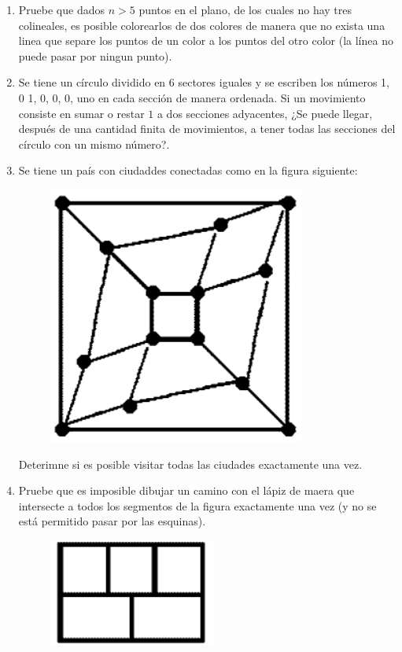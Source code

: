 \begin{enumerate}
	\item Pruebe que dados $n>5$ puntos en el plano, de los cuales no hay tres colineales, es posible colorearlos de dos colores de manera que no exista una linea que separe los puntos de un color a los puntos del otro color (la l\'inea no puede pasar por ningun punto).
	
	\item Se tiene un c\'irculo dividido en $6$ sectores iguales y se escriben los n\'umeros 1, 0 1, 0, 0, 0, uno en cada secci\'on de manera ordenada. Si un movimiento consiste en sumar o restar $1$ a dos secciones adyacentes, ¿Se puede llegar, despu\'es de una cantidad finita de movimientos, a tener todas las secciones del c\'irculo con un  mismo n\'umero?.
	
	\item Se tiene un pa\'is con ciudaddes conectadas como en la figura siguiente:
	\begin{center}
		\begin{figure}[h!]
			\centering
			\includegraphics[scale=.5]{imgs/cities.png}
		\end{figure}
	\end{center}
	Deterimne si es posible visitar todas las ciudades exactamente una vez.
	
	\item Pruebe que es imposible dibujar un camino con el l\'apiz de maera que intersecte a todos los segmentos de la figura exactamente una vez (y no se est\'a permitido pasar por las esquinas).
	\begin{center}
		\begin{figure}[h!]
			\centering
			\includegraphics[scale=.4]{imgs/curve.png}
		\end{figure}
	\end{center}
	

\end{enumerate}

